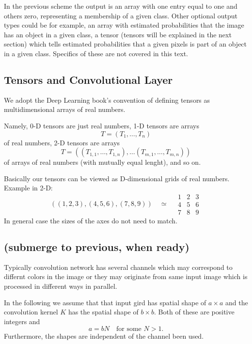 \documentclass[]{article}
\begin{document}
In the previous scheme the output is an array with one entry equal to one and others
zero, representing a membership of a given class. Other optional output types could
be for example, an array with estimated probabilities that the image has an object in
a given class, a tensor (tensors will be explained in the next section) which tells
estimated probabilities that a given pixels is part of an object in a given class.
Specifics of these are not covered in this text.

\subsection{Tensors and Convolutional Layer}
We adopt the Deep Learning book's convention of defining tensors as
multidimensional arrays of real numbers.

Namely, 0-D tensors are just real numbers, 1-D tensors are arrays
\[
T = (T_1, \ldots, T_n)
\]
of real numbers, 2-D tensors are arrays
\[
T = ((T_{1,1}, \ldots, T_{1,n}), \ldots (T_{m,1}, \ldots, T_{m,n}))
\]
of arrays of real numbers (with mutually equal lenght), and so on.

Basically our tensors can be viewed as D-dimensional grids of real numbers.
Example in 2-D:
\[
((1, 2, 3), (4, 5, 6), (7, 8, 9)) \quad \simeq \quad
\begin{array}{c|c|c}
  1 & 2 & 3 \\
  \hline
  4 & 5 & 6 \\
  \hline
  7 & 8 & 9
 \end{array}
\]
In general case the sizes of the axes do not need to match.


\subsection{(submerge to previous, when ready)}
Typically convolution network has several channels which may correspond to differnt
colors in the image or they may originate from same input image which is processed
in different ways in parallel.

In the following we assume that that input gird has spatial shape of $a \times a$
and the convolution kernel $K$ has the spatial shape of $b \times b$.
Both of these are positive integers and
\[
a = b N \quad \text{for some $N > 1$.}
\]
Furthermore, the shapes are independent of the channel been used.
\end{document}
